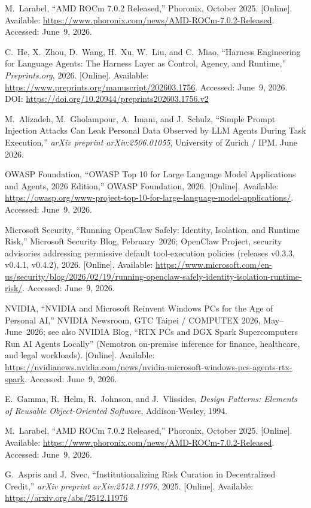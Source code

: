 \documentclass[12pt,a4paper]{report}
\begin{document}
{\begin{enumerate}[label={[\arabic*]}]
\item M.~Larabel, ``AMD ROCm 7.0.2 Released,'' Phoronix, October 2025. [Online]. Available: \url{https://www.phoronix.com/news/AMD-ROCm-7.0.2-Released}. Accessed: June~9, 2026.
\item C.~He, X.~Zhou, D.~Wang, H.~Xu, W.~Liu, and C.~Miao, ``Harness Engineering for Language Agents: The Harness Layer as Control, Agency, and Runtime,'' \textit{Preprints.org}, 2026. [Online]. Available: \url{https://www.preprints.org/manuscript/202603.1756}. Accessed: June~9, 2026. DOI: \url{https://doi.org/10.20944/preprints202603.1756.v2}
\item M.~Alizadeh, M.~Gholampour, A.~Imani, and J.~Schulz, ``Simple Prompt
Injection Attacks Can Leak Personal Data Observed by LLM Agents During Task
Execution,'' \textit{arXiv preprint arXiv:2506.01055}, University of Zurich / IPM,
June 2026.

\item OWASP Foundation, ``OWASP Top 10 for Large Language Model Applications and
Agents, 2026 Edition,'' OWASP Foundation, 2026. [Online]. Available:
\url{https://owasp.org/www-project-top-10-for-large-language-model-applications/}. Accessed: June~9, 2026.

\item Microsoft Security, ``Running OpenClaw Safely: Identity, Isolation, and Runtime Risk,'' Microsoft Security Blog, February~2026; OpenClaw Project, security advisories addressing permissive default tool-execution policies (releases v0.3.3, v0.4.1, v0.4.2), 2026. [Online]. Available: \url{https://www.microsoft.com/en-us/security/blog/2026/02/19/running-openclaw-safely-identity-isolation-runtime-risk/}. Accessed: June~9, 2026.

\item NVIDIA, ``NVIDIA and Microsoft Reinvent Windows PCs for the Age of Personal AI,'' NVIDIA Newsroom, GTC Taipei / COMPUTEX 2026, May--June~2026; see also NVIDIA Blog, ``RTX PCs and DGX Spark Supercomputers Run AI Agents Locally'' (Nemotron on-premise inference for finance, healthcare, and legal workloads). [Online]. Available: \url{https://nvidianews.nvidia.com/news/nvidia-microsoft-windows-pcs-agents-rtx-spark}. Accessed: June~9, 2026.

\item E.~Gamma, R.~Helm, R.~Johnson, and J.~Vlissides, \textit{Design Patterns:
Elements of Reusable Object-Oriented Software}, Addison-Wesley, 1994.

\item M.~Larabel, ``AMD ROCm 7.0.2 Released,'' Phoronix, October 2025. [Online]. Available: \url{https://www.phoronix.com/news/AMD-ROCm-7.0.2-Released}. Accessed: June~9, 2026.
\item G.~Aspris and J.~Svec, ``Institutionalizing Risk Curation in Decentralized Credit,'' \textit{arXiv preprint arXiv:2512.11976}, 2025. [Online]. Available: \url{https://arxiv.org/abs/2512.11976}


\end{enumerate}}
\end{document}
